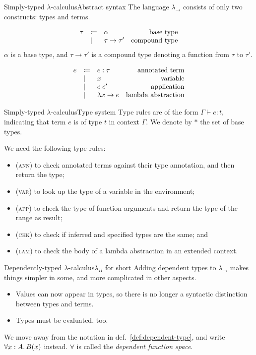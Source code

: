 \documentclass[serif, xcolor={svgnames, table}, usepdftitle=false]{beamer}
\begin{document}
\begin{frame}{Simply-typed \(\lambda\)-calculus}{Abstract syntax}
  The language \(\lambda_{\to}\) consists of only two constructs:
  types and terms.

  \[
    \begin{array}{lll>{$}r<{$}}
      \tau & \coloneqq & \alpha & base type\\
           & | & \tau \to \tau' & compound type
    \end{array}
  \]
  \(\alpha\) is a base type, and \(\tau \to \tau'\) is a compound type
  denoting a function from \(\tau\) to \(\tau'\).

  \[
    \begin{array}{lll>{$}r<{$}}
      e & \coloneqq & e : \tau & annotated term\\
        & | & x & variable\\
        & | & e \; e' & application\\
        & | & \lambda x \to e & lambda abstraction
    \end{array}
  \]
\end{frame}

\begin{frame}{Simply-typed \(\lambda\)-calculus}{Type system}
  Type rules are of the form \(\Gamma \vdash e : t\), indicating that
  term \(e\) is of type \(t\) in context \(\Gamma\).  We denote by
  \(*\) the set of base types.

  We need the following type rules:
  \begin{itemize}
  \item \textsc{(ann)} to check annotated terms against their type
    annotation, and then return the type;
  \item \textsc{(var)} to look up the type of a variable in the
    environment;
  \item \textsc{(app)} to check the type of function arguments and
    return the type of the range as result;
  \item \textsc{(chk)} to check if inferred and specified types are
    the same; and
  \item \textsc{(lam)} to check the body of a lambda abstraction in an
    extended context.
  \end{itemize}
\end{frame}

\begin{frame}{Dependently-typed
    \(\lambda\)-calculus}{\(\lambda_{\Pi}\) for short}
  Adding dependent types to \(\lambda_{\to}\) makes things simpler in
  some, and more complicated in other aspects.
  \begin{itemize}
  \item Values can now appear in types, so there is no longer a
    syntactic distinction between types and terms.
  \item Types must be evaluated, too.
  \end{itemize}

  We move away from the notation in def.~\ref{def:dependent-type}, and
  write \(\forall x : A\ldotp B(x)\) instead.  \(\forall\) is called
  the \emph{dependent function space}.
\end{frame}
\end{document}
